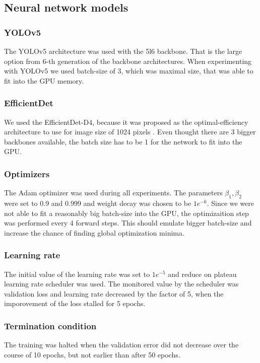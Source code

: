 \subsection{Neural network models}
\subsubsection{YOLOv5}
The YOLOv5 architecture was used with the 5l6 backbone. That is the large option from 6-th generation of the backbone architectures. When experimenting with YOLOv5 we used batch-size of 3, which was maximal size, that was able to fit into the GPU memory.
\subsubsection{EfficientDet}
We used the EfficientDet-D4, because it was proposed as the optimal-efficiency architecture to use for image size of 1024 pixels \cite{Tan2019}. Even thought there are 3 bigger backbones available, the batch size has to be 1 for the network to fit into the GPU.

\subsubsection{Optimizers}
The Adam optimizer was used during all experiments. The parameters $\beta_1, \beta_2$ were set to 0.9 and 0.999 and weight decay was chosen to be $1e^{-6}$. Since we were not able to fit a reasonably big batch-size into the GPU, the optimizaition step was performed every 4 forward steps. This should emulate bigger batch-size and increase the chance of finding global optimization minima.
\subsubsection{Learning rate}
The initial value of the learning rate was set to $1e^{-5}$ and reduce on plateau learning rate scheduler was used. The monitored value by the scheduler was validation loss and learning rate decreased by the factor of 5, when the imporovement of the loss stalled for 5 epochs.
\subsubsection{Termination condition}
The training was halted when the validation error did not decrease over the course of 10 epochs, but not earlier than after 50 epochs.


